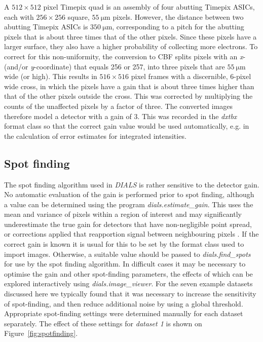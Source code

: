 \documentclass[preprint]{iucr}
\newcommand{\dxtbx}{\emph{dxtbx}\xspace}
\newcommand{\dials}{\emph{DIALS}\xspace}
\newcommand{\dialsestimategain}{\emph{dials.estimate\_gain}\xspace}
\newcommand{\dialsfindspots}{\emph{dials.find\_spots}\xspace}
\newcommand{\dialsimageviewer}{\emph{dials.image\_viewer}\xspace}
\begin{document}
A $512\times512$ pixel Timepix quad is an assembly of four abutting Timepix ASICs,
each with $256\times256$ square, $\SI{55}{\micro\metre}$ pixels. However, the distance
between two abutting Timepix ASICs is $\SI{350}{\micro\metre}$, corresponding
to a pitch for the abutting pixels that is about three times that of the other
pixels. Since these pixels have a larger surface, they also have a higher probability
of collecting more electrons. To correct for this non-uniformity, the conversion to
CBF splits pixels with an \emph{x}- (and/or \emph{y}-coordinate) that equals 256 or 257, into three
pixels that are $\SI{55}{\micro\metre}$ wide (or high). This results in $516\times516$ pixel
frames with a discernible, 6-pixel wide cross, in which the pixels have a gain that
is about three times higher than that of the other pixels outside the cross. This was
corrected by multiplying the counts of the unaffected pixels by a factor of three. The
converted images therefore model a detector with a gain of 3. This was recorded in the
\dxtbx format class so that the correct gain value would be used automatically, e.g.
in the calculation of error estimates for integrated intensities.

\subsection{Spot finding \label{sec:spot_finding}}

The spot finding algorithm used in \dials is rather sensitive to the detector
gain. No automatic evaluation of the gain is performed prior to spot finding,
although a value can be determined using the program \dialsestimategain. This
uses the mean and variance of pixels within a region of interest
\cite{leslie2006integration} and may significantly underestimate the true gain
for detectors that have non-negligible point spread, or corrections applied
that reapportion signal between neighbouring pixels \cite{Waterman2010}. If the
correct gain is known it is usual for this to be set by the format class used
to import images. Otherwise, a suitable value should be passed to
\dialsfindspots for use by the spot finding algorithm. In difficult cases it
may be necessary to optimise the gain and other spot-finding parameters, the
effects of which can be explored interactively using \dialsimageviewer. For the
seven example datasets discussed here we typically found that it was necessary
to increase the sensitivity of spot-finding, and then reduce additional noise
by using a global threshold. Appropriate spot-finding settings were determined
manually for each dataset separately. The effect of these settings for
\emph{dataset 1} is shown on Figure~\ref{fig:spotfinding}.
\end{document}
